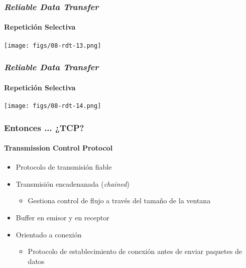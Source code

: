 \documentclass[letter]{beamer}
\begin{document}
\begin{frame}
  \frametitle{{\em Reliable Data Transfer}}
  \framesubtitle{Repetición Selectiva}


  \begin{center}
    \texttt{[image: figs/08-rdt-13.png]}
  \end{center}

\end{frame}
\begin{frame}
  \frametitle{{\em Reliable Data Transfer}}
  \framesubtitle{Repetición Selectiva}

  \begin{center}
    \texttt{[image: figs/08-rdt-14.png]}
  \end{center}


\end{frame}

\begin{frame}
  \frametitle{Entonces ... ¿TCP?}
  \framesubtitle{Transmission Control Protocol}

  \begin{itemize}
    \item Protocolo de transmisión fiable
    \item Transmisión encadenanada ({\em chained})
      \begin{itemize}
        \item Gestiona control de flujo a través del tamaño de la ventana
      \end{itemize}
    \item Buffer en emisor y en receptor
    \item Orientado a conexión
      \begin{itemize}
        \item Protocolo de establecimiento de conexión antes de enviar paquetes de datos
      \end{itemize}
  \end{itemize}

\end{frame}
\end{document}
